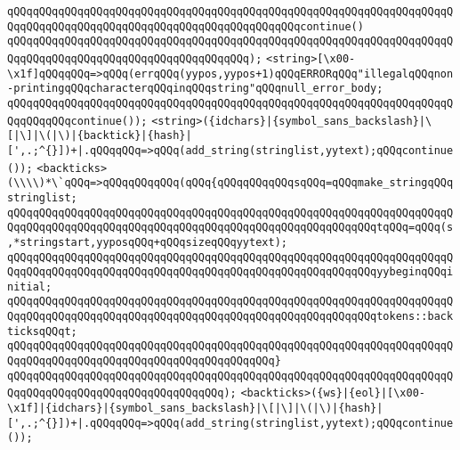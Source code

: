 \verb|qQQqqQQqqQQqqQQqqQQqqQQqqQQqqQQqqQQqqQQqqQQqqQQqqQQqqQQqqQQqqQQqqQQqqQQqqQQqqQQqqQQqqQQqqQQqqQQqqQQqqQQqqQQqqQQqqQQqcontinue()|\newline
\verb|qQQqqQQqqQQqqQQqqQQqqQQqqQQqqQQqqQQqqQQqqQQqqQQqqQQqqQQqqQQqqQQqqQQqqQQqqQQqqQQqqQQqqQQqqQQqqQQqqQQqqQQqqQQq);|\newline
\newline
\newline
\verb|<string>[\x00-\x1f]qQQqqQQq=>qQQq(errqQQq(yypos,yypos+1)qQQqERRORqQQq"illegalqQQqnon-printingqQQqcharacterqQQqinqQQqstring"qQQqnull_error_body;|\newline
\verb|qQQqqQQqqQQqqQQqqQQqqQQqqQQqqQQqqQQqqQQqqQQqqQQqqQQqqQQqqQQqqQQqqQQqqQQqqQQqqQQqcontinue());|\newline
\verb|<string>({idchars}|\verb#|{symbol_sans_backslash}|\[|\]|\(|\)|{backtick}|{hash}|[',.;^{}])+|.qQQqqQQq=>qQQq(add_string(stringlist,yytext);qQQqcontinue());#\newline
\newline
\newline
\verb|<backticks>(\\\\)*\`qQQq=>qQQqqQQqqQQq(qQQq{qQQqqQQqqQQqsqQQq=qQQqmake_stringqQQqstringlist;|\newline
\verb|qQQqqQQqqQQqqQQqqQQqqQQqqQQqqQQqqQQqqQQqqQQqqQQqqQQqqQQqqQQqqQQqqQQqqQQqqQQqqQQqqQQqqQQqqQQqqQQqqQQqqQQqqQQqqQQqqQQqqQQqqQQqqQQqtqQQq=qQQq(s,*stringstart,yyposqQQq+qQQqsizeqQQqyytext);|\newline
\verb|qQQqqQQqqQQqqQQqqQQqqQQqqQQqqQQqqQQqqQQqqQQqqQQqqQQqqQQqqQQqqQQqqQQqqQQqqQQqqQQqqQQqqQQqqQQqqQQqqQQqqQQqqQQqqQQqqQQqqQQqqQQqqQQqyybeginqQQqinitial;|\newline
\verb|qQQqqQQqqQQqqQQqqQQqqQQqqQQqqQQqqQQqqQQqqQQqqQQqqQQqqQQqqQQqqQQqqQQqqQQqqQQqqQQqqQQqqQQqqQQqqQQqqQQqqQQqqQQqqQQqqQQqqQQqqQQqqQQqtokens::backticksqQQqt;|\newline
\verb|qQQqqQQqqQQqqQQqqQQqqQQqqQQqqQQqqQQqqQQqqQQqqQQqqQQqqQQqqQQqqQQqqQQqqQQqqQQqqQQqqQQqqQQqqQQqqQQqqQQqqQQqqQQqqQQq}|\newline
\verb|qQQqqQQqqQQqqQQqqQQqqQQqqQQqqQQqqQQqqQQqqQQqqQQqqQQqqQQqqQQqqQQqqQQqqQQqqQQqqQQqqQQqqQQqqQQqqQQqqQQqqQQq);|\newline
\newline
\newline
\verb|<backticks>({ws}|\verb#|{eol}|[\x00-\x1f]|{idchars}|{symbol_sans_backslash}|\[|\]|\(|\)|{hash}|[',.;^{}])+|.qQQqqQQq=>qQQq(add_string(stringlist,yytext);qQQqcontinue());#\newline
